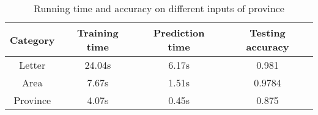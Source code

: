 \begin{table}[ht]
\centering
\scalebox{0.80} {
    \begin{tabular}{|c|c|c|c|}
        \hline
        Category&Training time&Prediction time&Testing accuracy\\
        \hline
        Letter &24.04s&6.17s&0.981\\
        \hline
        Area&7.67s&1.51s&0.9784\\
        \hline
        Province&4.07s&0.45s&0.875\\
        \hline
    \end{tabular}
}
\caption{Running time and accuracy on different inputs of province}
\label{tabel3}
\end{table}

